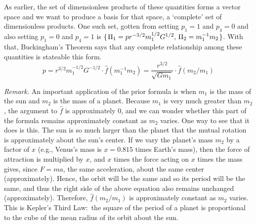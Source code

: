 As earlier, 
the set of dimensionless products of these quantities forms a vector space
and we want to produce a basis for that space, 
a `complete' set of dimensionless products.
One such set, gotten from setting $p_1=1$ and $p_4=0$ 
and also setting $p_1=0$ and $p_4=1$ is
$\mbox{$\{\hspace{0.1em}\Pi_1=pr^{-3/2}m_1^{1/2}G^{1/2},\,\Pi_2=m_1^{-1}m_2\hspace{0.1em}\}$}$.
With that, Buckingham's Theorem says that
any complete relationship among these quantities is stateable this form.
\begin{equation*}
  p = r^{3/2}m_1^{-1/2}G^{-1/2}\cdot\hat{f}(m_1^{-1}m_2)  
    = \frac{r^{3/2}}{\sqrt{Gm_1}}\cdot\hat{f}(m_2/m_1)
\end{equation*}

\textit{Remark.}
An important application of the prior formula is
when $m_1$ is the mass of the sun and $m_2$ is the mass  
of a planet.
Because $m_1$ is very much greater than $m_2$, 
the argument to $\hat{f}$ is approximately $0$, 
and we can wonder whether
this part of the formula remains approximately constant as $m_2$ varies.
One way to see that it does is this.
The sun is so much larger than the planet
that the mutual rotation is approximately about the sun's center.
If we vary the planet's mass $m_2$ by a factor of $x$ 
(e.g., Venus's mass is
$x=0.815$ times Earth's mass),
then the force of attraction is multiplied by $x$,
and $x$ times the force acting on $x$ times the mass gives, since $F=ma$, 
the same acceleration, about the same center (approximately).
Hence,
the orbit will be the same and so its period will be the same, 
and thus the right side of the above equation also remains unchanged 
(approximately).
Therefore,
$\hat{f}(m_2/m_1)$ is approximately constant as $m_2$ varies.
This is Kepler's Third Law:~the square of the
period of a planet is proportional to the cube of the mean radius of its orbit
about the sun.

